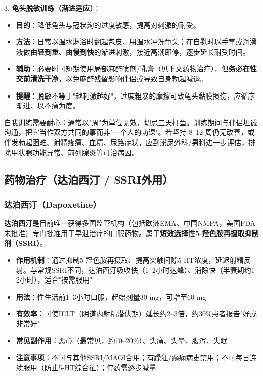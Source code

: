 3. \textbf{龟头脱敏训练（渐进适应）}：
  \begin{itemize}
  \item \textbf{目的}：降低龟头与冠状沟的过度敏感，提高对刺激的耐受。
  \item \textbf{方法}：日常以温水淋浴时翻起包皮、用温水冲洗龟头；在自慰时以手掌或润滑液做\textbf{由轻到重、由慢到快}的渐进刺激，接近高潮即停，逐步延长耐受时间。
  \item \textbf{辅助}：必要时可短期使用局部麻醉喷剂/乳膏（见下文药物治疗），但\textbf{务必在性交前清洗干净}，以免麻醉残留影响伴侣或导致自身勃起减退。
  \item \textbf{提醒}：脱敏不等于"越刺激越好"，过度粗暴的摩擦可致龟头黏膜损伤，应循序渐进、以不痛为度。
  \end{itemize}

\begin{tcolorbox}[colback=pink!5!white,colframe=red!50!black,title=贴心小叮咛]
自我训练需要耐心：通常以"周"为单位见效，切忌三天打鱼。训练期间与伴侣坦诚沟通，把它当作双方共同的事而非"一个人的功课"。若坚持 8--12 周仍无改善，或伴发勃起困难、射精疼痛、血精、尿路症状，应到泌尿外科/男科进一步评估，排除甲状腺功能异常、前列腺炎等可治病因。
\end{tcolorbox}

\subsection{药物治疗（达泊西汀 / SSRI外用）}

\subsubsection{达泊西汀（Dapoxetine）}

\textbf{达泊西汀}是目前唯一获得多国监管机构（包括欧洲EMA、中国NMPA，美国FDA未批准）专门批准用于早泄治疗的口服药物。属于\textbf{短效选择性5-羟色胺再摄取抑制剂（SSRI）}。

\begin{itemize}[leftmargin=2cm]
	\item \textbf{作用机制}：通过抑制5-羟色胺再摄取、提高突触间隙5-HT浓度，延迟射精反射。与常规SSRI不同，达泊西汀吸收快（1--2小时达峰）、消除快（半衰期约1--2小时），适合"按需服用"
	\item \textbf{用法}：性生活前1--3小时口服，起始剂量30 mg，可增至60 mg
	\item \textbf{有效率}：可使IELT（阴道内射精潜伏期）延长约2--3倍，约30\%患者报告"好或非常好"
	\item \textbf{常见副作用}：恶心（最常见，约10--20\%）、头痛、头晕、腹泻、失眠
	\item \textbf{注意事项}：不可与其他SSRI/MAOI合用；有躁狂/癫痫病史禁用；不可每日连续服用（防止5-HT综合征）；停药需逐步减量
\end{itemize}


